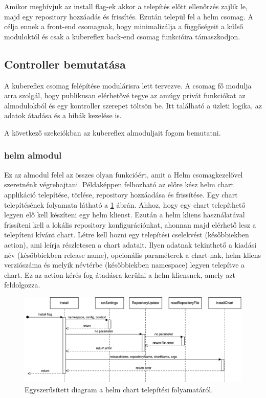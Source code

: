 Amikor meghívjuk az install flag-ek akkor a telepítés előtt ellenőrzés zajlik le, majd egy repository hozzáadás és frissítés.
Ezután települ fel a helm csomag.
A célja ennek a front-end csomagnak, hogy minimalizálja a függőségeit a külső moduloktól és csak a kubereflex back-end csomag funkcióira támaszkodjon.

\subsection{Controller bemutatása}
A kubereflex csomag felépítése modulárisra lett tervezve.
A csomag fő modulja arra szolgál, hogy publikusan elérhetővé tegye az amúgy privát funkciókat az almodulokból és egy kontroller szerepet töltsön be.
Itt található a üzleti logika, az adatok átadása és a hibák kezelése is.

A következő szekciókban az kubereflex almoduljait fogom bemutatni.

\subsubsection*{helm almodul}
Ez az almodul felel az összes olyan funkcióért, amit a Helm csomagkezelővel szeretnénk végrehajtani.
Példaképpen felhozható az előre kész helm chart applikáció telepítése, törlése, repository hozzáadása és frissítése.
Egy chart telepítésének folyamata látható a \ref{helm-simple-sequence} ábrán.
Ahhoz, hogy egy chart telepíthető legyen elő kell készíteni egy helm klienst.
Ezután a helm kliens használatával frissíteni kell a lokális repository konfigurációnkat, ahonnan majd elérhető lesz a telepíteni kívánt chart.
Létre kell hozni egy telepítési cselekvést (későbbiekben action), ami leírja részletesen a chart adatait. Ilyen adatnak tekinthető a kiadási név (későbbiekben release name), opcionális paraméterek a chart-nak, helm kliens verziószáma és melyik névtérbe (későbbiekben namespace) legyen telepítve a chart.
Ez az action kérés fog átadásra kerülni a helm kliensnek, amely azt feldolgozza.

\begin{figure}[ht]
    \centering
         \includegraphics[width=1.0\textwidth]{figures/kli/helm-simple-sequence.png}
          \caption{Egyszerűsített diagram a helm chart telepítési folyamatáról.}
           \label{helm-simple-sequence}
\end{figure}

